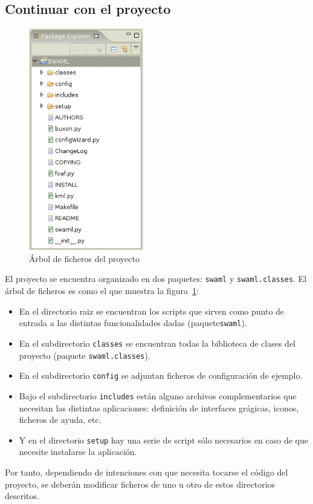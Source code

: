 \subsection*{Continuar con el proyecto}

\begin{figure}[H]
	\centering
	\includegraphics[width=5cm]{images/screenshots/package-explorer.png}
	\caption{Árbol de ficheros del proyecto}
	\label{fig:package-explorer}
\end{figure}

El proyecto se encuentra organizado en dos paquetes: \texttt{swaml} y \texttt{swaml.classes}.
El árbol de ficheros es como el que muestra la figura~\ref{fig:package-explorer}:

\begin{itemize}
  \item En el directorio raiz se encuentran los scripts que sirven como punto de entrada
	a las distintas funcionalidades dadas (paquete\texttt{swaml}).
  \item En el subdirectorio \texttt{classes} se encuentran  todas la biblioteca de clases
	del proyecto (paquete \texttt{swaml.classes}).
  \item En el subdirectorio \texttt{config} se adjuntan ficheros de configuración de ejemplo.
  \item Bajo el subdirectorio \texttt{includes} están alguno archivos complementarios
	que necesitan las distintas aplicaciones: definición de interfaces grágicas, iconos,
	ficheros de ayuda, etc.
  \item Y en el directorio \texttt{setup} hay una serie de script sólo necesarios en caso
	de que necesite instalarse la aplicación.
\end{itemize}

Por tanto, dependiendo de intenciones con que necesita tocarse el código del proyecto,
se deberán modificar ficheros de uno u otro de estos directorios descritos.
